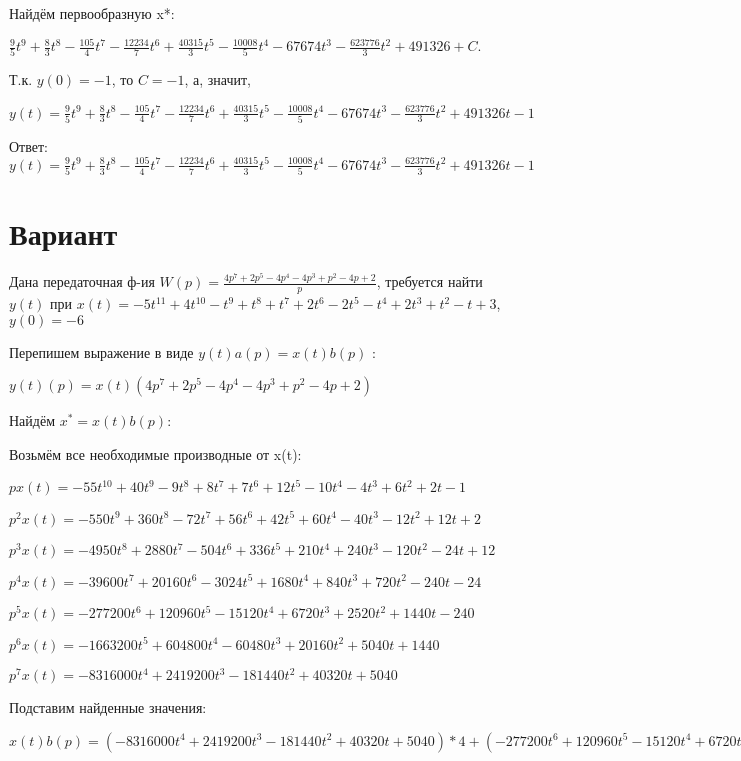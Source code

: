 \documentclass{article}
\begin{document}
{{Найдём первообразную x*:

$\frac{9}{5}t^{9}+\frac{8}{3}t^{8}-\frac{105}{4}t^{7}-\frac{12234}{7}t^{6}+\frac{40315}{3}t^{5}-\frac{10008}{5}t^{4}-67674t^{3}-\frac{623776}{3}t^{2}+491326+C.$

Т.к. $y(0)=-1$, то $C=-1$, а, значит, 

$y(t)=\frac{9}{5}t^{9}+\frac{8}{3}t^{8}-\frac{105}{4}t^{7}-\frac{12234}{7}t^{6}+\frac{40315}{3}t^{5}-\frac{10008}{5}t^{4}-67674t^{3}-\frac{623776}{3}t^{2}+491326t-1$

Ответ: $y(t) = \frac{9}{5}t^{9}+\frac{8}{3}t^{8}-\frac{105}{4}t^{7}-\frac{12234}{7}t^{6}+\frac{40315}{3}t^{5}-\frac{10008}{5}t^{4}-67674t^{3}-\frac{623776}{3}t^{2}+491326t-1$

\section{Вариант}

Дана передаточная ф-ия $W(p)=\frac{4p^{7}+2p^{5}-4p^{4}-4p^{3}+p^{2}-4p+2}{p}$, требуется найти $y(t)$ при $x(t)=-5t^{11}+4t^{10}-t^{9}+t^{8}+t^{7}+2t^{6}-2t^{5}-t^{4}+2t^{3}+t^{2}-t+3$, $y(0)=-6$

Перепишем выражение в виде $y(t)a(p)=x(t)b(p)$ :

$y(t)(p)=x(t)(4p^{7}+2p^{5}-4p^{4}-4p^{3}+p^{2}-4p+2)$

Найдём $x^*=x(t)b(p)$:

Возьмём все необходимые производные от x(t):

$px(t)=-55t^{10}+40t^{9}-9t^{8}+8t^{7}+7t^{6}+12t^{5}-10t^{4}-4t^{3}+6t^{2}+2t-1$

$p^2x(t)=-550t^{9}+360t^{8}-72t^{7}+56t^{6}+42t^{5}+60t^{4}-40t^{3}-12t^{2}+12t+2$

$p^3x(t)=-4950t^{8}+2880t^{7}-504t^{6}+336t^{5}+210t^{4}+240t^{3}-120t^{2}-24t+12$

$p^4x(t)=-39600t^{7}+20160t^{6}-3024t^{5}+1680t^{4}+840t^{3}+720t^{2}-240t-24$

$p^5x(t)=-277200t^{6}+120960t^{5}-15120t^{4}+6720t^{3}+2520t^{2}+1440t-240$

$p^6x(t)=-1663200t^{5}+604800t^{4}-60480t^{3}+20160t^{2}+5040t+1440$

$p^7x(t)=-8316000t^{4}+2419200t^{3}-181440t^{2}+40320t+5040$

Подставим найденные значения:

$x(t)b(p) = (-8316000t^{4}+2419200t^{3}-181440t^{2}+40320t+5040)*4+(-277200t^{6}+120960t^{5}-15120t^{4}+6720t^{3}+2520t^{2}+1440t-240)*2+(-39600t^{7}+20160t^{6}-3024t^{5}+1680t^{4}+840t^{3}+720t^{2}-240t-24)*(-4)+(-4950t^{8}+2880t^{7}-504t^{6}+336t^{5}+210t^{4}+240t^{3}-120t^{2}-24t+12)*(-4)+(-550t^{9}+360t^{8}-72t^{7}+56t^{6}+42t^{5}+60t^{4}-40t^{3}-12t^{2}+12t+2)*1+(-55t^{10}+40t^{9}-9t^{8}+8t^{7}+7t^{6}+12t^{5}-10t^{4}-4t^{3}+6t^{2}+2t-1)*(-4)+(-55t^{10}+40t^{9}-9t^{8}+8t^{7}+7t^{6}+12t^{5}-10t^{4}-4t^{3}+6t^{2}+2t-1)*2=110t^{10}-630t^{9}+20178t^{8}+146792t^{7}-632982t^{6}+252690t^{5}-33301720t^{4}+9685888t^{3}-723144t^{2}+165224t$





}}
\end{document}
